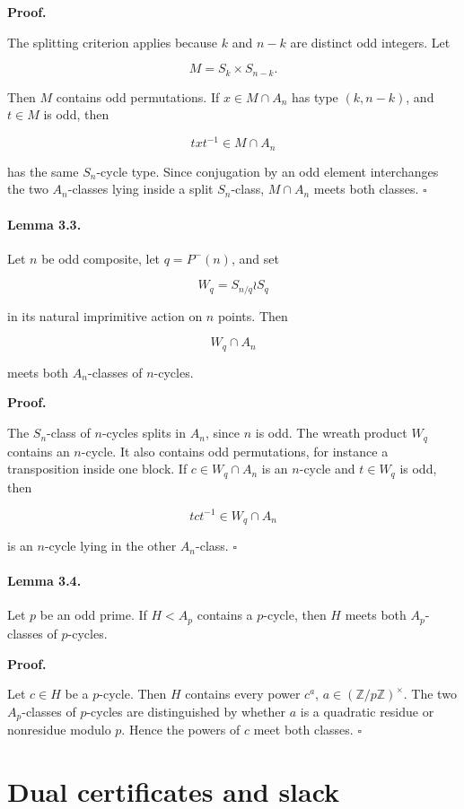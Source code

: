 \documentclass[11pt]{article}
\begin{document}
\noindent\textbf{Proof.}

The splitting criterion applies because $k$ and $n-k$ are distinct odd integers. Let

\[
M=S_k\times S_{n-k}.
\]

Then $M$ contains odd permutations. If $x\in M\cap A_n$ has type $(k,n-k)$, and $t\in M$ is odd, then

\[
txt^{-1}\in M\cap A_n
\]

has the same $S_n$-cycle type. Since conjugation by an odd element interchanges the two $A_n$-classes lying inside a split $S_n$-class, $M\cap A_n$ meets both classes. $\square$

\paragraph{Lemma 3.3.}

Let $n$ be odd composite, let $q=P^-(n)$, and set

\[
W_q=S_{n/q}\wr S_q
\]

in its natural imprimitive action on $n$ points. Then

\[
W_q\cap A_n
\]

meets both $A_n$-classes of $n$-cycles.

\noindent\textbf{Proof.}

The $S_n$-class of $n$-cycles splits in $A_n$, since $n$ is odd. The wreath product $W_q$ contains an $n$-cycle. It also contains odd permutations, for instance a transposition inside one block. If $c\in W_q\cap A_n$ is an $n$-cycle and $t\in W_q$ is odd, then

\[
tct^{-1}\in W_q\cap A_n
\]

is an $n$-cycle lying in the other $A_n$-class. $\square$

\paragraph{Lemma 3.4.}

Let $p$ be an odd prime. If $H<A_p$ contains a $p$-cycle, then $H$ meets both $A_p$-classes of $p$-cycles.

\noindent\textbf{Proof.}

Let $c\in H$ be a $p$-cycle. Then $H$ contains every power $c^a$, $a\in(\mathbb Z/p\mathbb Z)^\times$. The two $A_p$-classes of $p$-cycles are distinguished by whether $a$ is a quadratic residue or nonresidue modulo $p$. Hence the powers of $c$ meet both classes. $\square$

\section{Dual certificates and slack}
\end{document}
